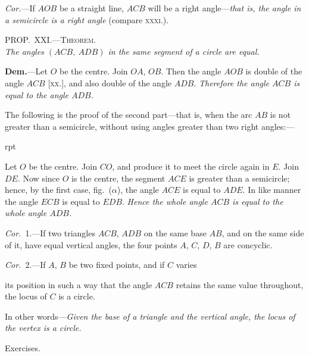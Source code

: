 \documentclass[oneside]{book}
\newcounter{wrapwidth}
\newcommand\myprop[2]{
\bigskip\Needspace*{4\baselineskip}\begin{center}\textsc{#1}\\\medskip\emph{#2}\par\end{center}
}
\newcommand\exhead[1]{
\Needspace*{5\baselineskip}\begin{center}
\textsf{#1}
\end{center}
}
\newcommand\imgflow[3]{
\setcounter{wrapwidth}{#1}

\begin{wrapfigure}[#2]{r}{\value{wrapwidth}pt}
\begin{center}
\vspace{-0.3in}

\end{center}
\end{wrapfigure}
}
\newcommand\imgcent[2]{
\begin{center}

\end{center}
}
\begin{document}
\emph{Cor.}---If $AOB$ be a straight line, $ACB$ will be a
right angle---\emph{that is, the angle in a semicircle is a right
angle} (compare \textsc{xxxi.}).


\myprop{PROP\@.~XXI\@.---Theorem.}{The angles $(ACB,\ ADB)$ in the same segment of a circle
are equal.}


\imgcent{235}{f127}

\textbf{Dem.}---Let $O$ be the centre. Join $OA$, $OB$. Then
the angle $AOB$ is double of the angle $ACB$ [\textsc{xx.}], and
also double of the angle $ADB$. \textit{Therefore the angle
$ACB$ is equal to the angle $ADB$.}

The following is the proof of the second part---that
is, when the arc $AB$ is not greater than a semicircle,
without using angles greater than two right angles:---


\imgflow{115}{9}{f128}

Let $O$ be the centre. Join $CO$, and produce it to meet
the circle again in $E$. Join $DE$.
Now since $O$ is the centre, the
segment $ACE$ is greater than a
semicircle; hence, by the first
case, fig.~($\alpha$), the angle $ACE$ is
equal to $ADE$. In like manner
the angle $ECB$ is equal to $EDB$.
\textit{Hence the whole angle $ACB$ is
equal to the whole angle $ADB$.}

\emph{Cor.}~1.---If two triangles $ACB$, $ADB$ on the same
base $AB$, and on the same side of it, have equal vertical
angles, the four points $A$, $C$, $D$, $B$ are concyclic\label{concylic1}.

\emph{Cor.}~2.---If $A$, $B$ be two fixed points, and if $C$ varies

its position in such a way that the angle $ACB$ retains
the same value throughout, the locus of $C$ is a circle.

In other words---\emph{Given the base of a triangle and the
vertical angle, the locus of the vertex is a circle.}

\exhead{Exercises.}
\end{document}
